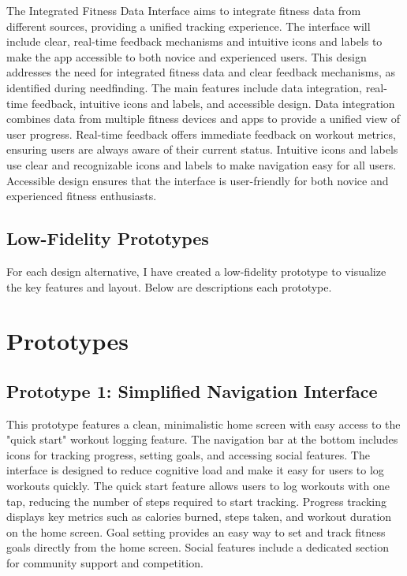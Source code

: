 \documentclass[
	letterpaper, %
]{jdf}
\begin{document}
The Integrated Fitness Data Interface aims to integrate fitness data from different sources, providing a unified tracking experience. The interface will include clear, real-time feedback mechanisms and intuitive icons and labels to make the app accessible to both novice and experienced users. This design addresses the need for integrated fitness data and clear feedback mechanisms, as identified during needfinding. The main features include data integration, real-time feedback, intuitive icons and labels, and accessible design. Data integration combines data from multiple fitness devices and apps to provide a unified view of user progress. Real-time feedback offers immediate feedback on workout metrics, ensuring users are always aware of their current status. Intuitive icons and labels use clear and recognizable icons and labels to make navigation easy for all users. Accessible design ensures that the interface is user-friendly for both novice and experienced fitness enthusiasts.

\subsection {Low-Fidelity Prototypes}
For each design alternative, I have created a low-fidelity prototype to visualize the key features and layout. Below are descriptions each prototype.
\hfill \break
\hfill \break

\section{Prototypes}
\subsection{Prototype 1: Simplified Navigation Interface}
This prototype features a clean, minimalistic home screen with easy access to the "quick start" workout logging feature. The navigation bar at the bottom includes icons for tracking progress, setting goals, and accessing social features. The interface is designed to reduce cognitive load and make it easy for users to log workouts quickly. The quick start feature allows users to log workouts with one tap, reducing the number of steps required to start tracking. Progress tracking displays key metrics such as calories burned, steps taken, and workout duration on the home screen. Goal setting provides an easy way to set and track fitness goals directly from the home screen. Social features include a dedicated section for community support and competition.
\end{document}
